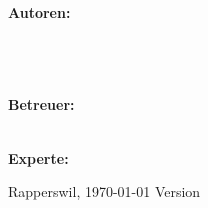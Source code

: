 \begin{titlepage}
\begin{center}
		\vfill
	\end{center}
	
		
	\begin{flushleft}
		\textbf{\LARGE Autoren:}\\
		\Large \rlif \\
		\Large \chuf \\
		\Large \fscf \\
		\vspace{1cm}
		
		\textbf{\LARGE Betreuer:}\\
		\Large \proff\\
		\vspace{0.5cm}
		
		\textbf{\LARGE Experte:}\\
		\Large \proff
		\vspace{0.5cm}
		
		\vspace{1.5cm}
		 Rapperswil, \today
		\hfill
		Version \version
	\end{flushleft}

\end{titlepage}

\restoregeometry
